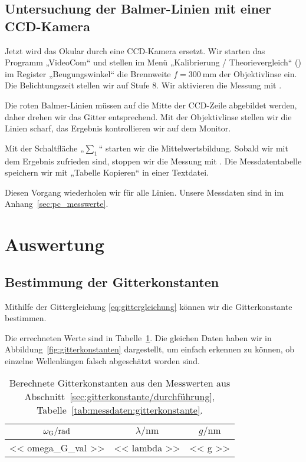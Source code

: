 \FloatBarrier
\subsection{Untersuchung der Balmer-Linien mit einer CCD-Kamera}

Jetzt wird das Okular durch eine CCD-Kamera ersetzt. Wir starten das Programm
„VideoCom“ und stellen im Menü „Kalibrierung / Theorievergleich“
() im Register „Beugungswinkel“ die Brennweite $f =
\SI{300}{\milli\meter}$ der Objektivlinse ein. Die Belichtungszeit stellen wir
auf Stufe 8. Wir aktivieren die Messung mit .

Die roten Balmer-Linien müssen auf die Mitte der CCD-Zeile abgebildet werden,
daher drehen wir das Gitter entsprechend. Mit der Objektivlinse stellen wir die
Linien scharf, das Ergebnis kontrollieren wir auf dem Monitor.

Mit der Schaltfläche „$\sum_1$“ starten wir die Mittelwertsbildung. Sobald wir
mit dem Ergebnis zufrieden sind, stoppen wir die Messung mit .
Die Messdatentabelle speichern wir mit „Tabelle Kopieren“ in einer Textdatei.

Diesen Vorgang wiederholen wir für alle Linien. Unsere Messdaten sind in
im Anhang~\ref{sec:pc_messwerte}.

\FloatBarrier
\section{Auswertung}

\FloatBarrier
\subsection{Bestimmung der Gitterkonstanten}

Mithilfe der Gittergleichung \eqref{eq:gittergleichung} können wir die
Gitterkonstante bestimmen.

Die errechneten Werte sind in Tabelle~\ref{tab:gitterkonstante}. Die gleichen
Daten haben wir in Abbildung~\ref{fig:gitterkonstanten} dargestellt, um einfach
erkennen zu können, ob einzelne Wellenlängen falsch abgeschätzt worden sind.

\begin{table}[htbp]
    \centering
    \begin{tabular}{SS|S}
        {$\omega_\text G / \si{\radian}$} &
        {$\lambda / \si{\nano\meter}$} &
        {$g / \si{\nano\meter}$} \\
        \midrule
        << omega_G_val >> & << lambda >>  & << g >> \\
    \end{tabular}
    \caption{%
        Berechnete Gitterkonstanten aus den Messwerten aus
        Abschnitt~\ref{sec:gitterkonstante/durchführung},
        Tabelle~\ref{tab:messdaten:gitterkonstante}.
    }
    \label{tab:gitterkonstante}
\end{table}

